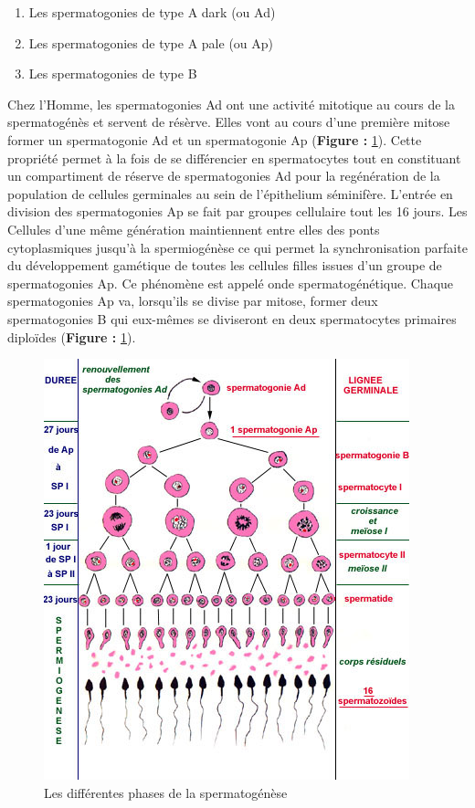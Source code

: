 \documentclass[12pt,twoside]{reedthesis}
\providecommand{\tightlist}{%
  \setlength{\itemsep}{0pt}\setlength{\parskip}{0pt}}
\theoremstyle{definition}
\theoremstyle{definition}
\theoremstyle{remark}
\begin{document}
  \begin{enumerate}
  \def\labelenumi{\arabic{enumi}.}
  \tightlist
  \item
    Les spermatogonies de type A dark (ou Ad)\\
  \item
    Les spermatogonies de type A pale (ou Ap)\\
  \item
    Les spermatogonies de type B
  \end{enumerate}
  
  Chez l'Homme, les spermatogonies Ad ont une activité mitotique au cours
  de la spermatogénès et servent de résèrve. Elles vont au cours d'une
  première mitose former un spermatogonie Ad et un spermatogonie Ap
  (\textbf{Figure :} \ref{fig:spermatogenese}). Cette propriété permet à
  la fois de se différencier en spermatocytes tout en constituant un
  compartiment de réserve de spermatogonies Ad pour la regénération de la
  population de cellules germinales au sein de l'épithelium séminifère.
  L'entrée en division des spermatogonies Ap se fait par groupes
  cellulaire tout les 16 jours. Les Cellules d'une même génération
  maintiennent entre elles des ponts cytoplasmiques jusqu'à la
  spermiogénèse ce qui permet la synchronisation parfaite du développement
  gamétique de toutes les cellules filles issues d'un groupe de
  spermatogonies Ap. Ce phénomène est appelé onde spermatogénétique.
  Chaque spermatogonies Ap va, lorsqu'ils se divise par mitose, former
  deux spermatogonies B qui eux-mêmes se diviseront en deux spermatocytes
  primaires diploïdes (\textbf{Figure :} \ref{fig:spermatogenese}).
  
  \begin{figure}
  
  {\centering \includegraphics[scale=0.75]{figure/spermatogenese} 
  
  }
  
  \caption{Les différentes phases de la spermatogénèse}\label{fig:spermatogenese}
  \end{figure}
  
\end{document}
